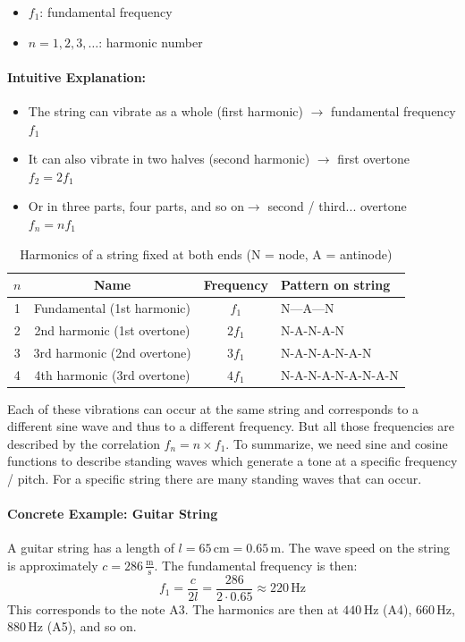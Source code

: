 \begin{itemize}
    \item $f_1$: fundamental frequency
    \item $n = 1,2,3,\dots$: harmonic number
\end{itemize}

\paragraph{Intuitive Explanation:}
\begin{itemize}
    \item The string can vibrate as a whole (first harmonic) $\rightarrow $ fundamental frequency $f_1$
    \item It can also vibrate in two halves (second harmonic) $\rightarrow $ first overtone $f_2 = 2 f_1$
    \item Or in three parts, four parts, and so on$\rightarrow $  second / third...  overtone $f_n = n f_1$
\end{itemize}

\begin{table}[h]
\centering
\begin{tabular}{|c|c|c|l|}
\hline
$n$ & Name & Frequency & Pattern on string \\
\hline
1 & Fundamental (1st harmonic) & $f_1$       & N---A---N \\
2 & 2nd harmonic (1st overtone) & $2f_1$     & N-A-N-A-N \\
3 & 3rd harmonic (2nd overtone) & $3f_1$     & N-A-N-A-N-A-N \\
4 & 4th harmonic (3rd overtone) & $4f_1$     & N-A-N-A-N-A-N-A-N \\
\hline
\end{tabular}
\caption{Harmonics of a string fixed at both ends (N = node, A = antinode)}
\label{tab:harmonics}
\end{table}

Each of these vibrations can occur at the same string and  corresponds to a different sine wave and thus to a different frequency. But all those frequencies are described by the correlation $f_n = n \times f_1$. 
To summarize, we need sine and cosine functions to describe standing waves which generate a tone at a specific frequency / pitch. For a specific string there are many standing waves that can occur. 


\paragraph{Concrete Example: Guitar String}
A guitar string has a length of $l = 65\,\text{cm} = 0.65\,\text{m}$. 
The wave speed on the string is approximately $c = 286\,\frac{\text{m}}{\text{s}}$. 
The fundamental frequency is then:
\begin{equation}
    f_1 = \frac{c}{2l} = \frac{286}{2 \cdot 0.65} \approx 220\,\text{Hz}
\end{equation}
This corresponds to the note A3. The harmonics are then at 
$440\,\text{Hz}$ (A4), $660\,\text{Hz}$, $880\,\text{Hz}$ (A5), and so on. 



